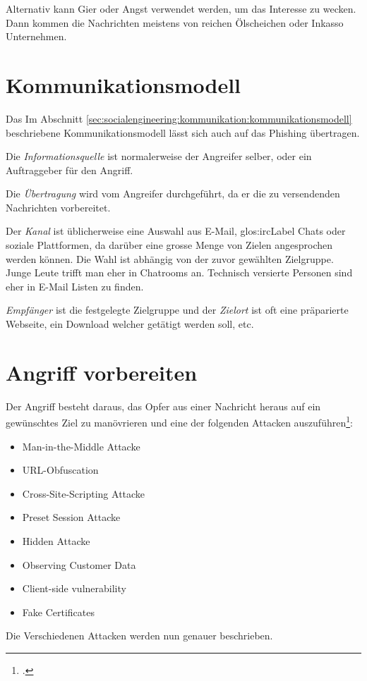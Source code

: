 Alternativ kann Gier oder Angst verwendet werden, um das Interesse zu wecken. Dann kommen die Nachrichten meistens von reichen Ölscheichen oder Inkasso Unternehmen.

\section{Kommunikationsmodell}
Das Im Abschnitt \ref{sec:socialengineering:kommunikation:kommunikationsmodell} beschriebene Kommunikationsmodell lässt sich auch auf das Phishing übertragen.

Die \textit{Informationsquelle} ist normalerweise der Angreifer selber, oder ein Auftraggeber für den Angriff.

Die \textit{Übertragung} wird vom Angreifer durchgeführt, da er die zu versendenden Nachrichten vorbereitet.

Der \textit{Kanal} ist üblicherweise eine Auswahl aus E-Mail,  \Gls{glos:ircLabel} Chats oder soziale Plattformen, da darüber eine grosse Menge von Zielen angesprochen werden können. Die Wahl ist abhängig von der zuvor gewählten Zielgruppe. Junge Leute trifft man eher in Chatrooms an. Technisch versierte Personen sind eher in E-Mail Listen zu finden.

\textit{Empfänger} ist die festgelegte Zielgruppe und der \textit{Zielort} ist oft eine präparierte Webseite, ein Download welcher getätigt werden soll, etc.

\section{Angriff vorbereiten}
Der Angriff besteht daraus, das Opfer aus einer Nachricht heraus auf ein gewünschtes Ziel zu manövrieren und eine der folgenden Attacken auszuführen\footcite{NISR-WP-Phishingv101doc_2015-06-29}:
\begin{itemize}
\item Man-in-the-Middle Attacke
\item URL-Obfuscation
\item Cross-Site-Scripting Attacke
\item Preset Session Attacke
\item Hidden Attacke
\item Observing Customer Data
\item Client-side vulnerability
\item Fake Certificates
\end{itemize}

Die Verschiedenen Attacken werden nun genauer beschrieben.

